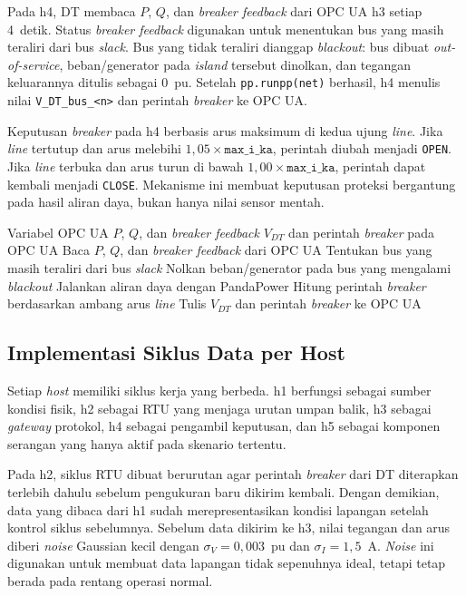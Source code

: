 Pada h4, \ac{DT} membaca $P$, $Q$, dan \textit{breaker feedback} dari OPC UA h3 setiap 4~detik. Status \textit{breaker feedback} digunakan untuk menentukan bus yang masih teraliri dari bus \textit{slack}. Bus yang tidak teraliri dianggap \textit{blackout}: bus dibuat \textit{out-of-service}, beban/generator pada \textit{island} tersebut dinolkan, dan tegangan keluarannya ditulis sebagai 0~pu. Setelah \texttt{pp.runpp(net)} berhasil, h4 menulis nilai \texttt{V\_DT\_bus\_<n>} dan perintah \textit{breaker} ke OPC UA.

Keputusan \textit{breaker} pada h4 berbasis arus maksimum di kedua ujung \textit{line}. Jika \textit{line} tertutup dan arus melebihi $1{,}05 \times \texttt{max\_i\_ka}$, perintah diubah menjadi \texttt{OPEN}. Jika \textit{line} terbuka dan arus turun di bawah $1{,}00 \times \texttt{max\_i\_ka}$, perintah dapat kembali menjadi \texttt{CLOSE}. Mekanisme ini membuat keputusan proteksi bergantung pada hasil aliran daya, bukan hanya nilai sensor mentah.

\begin{algorithm}[H]
\caption{Siklus \textit{digital twin} pada h4}
\begin{compactalgorithmic}[1]
\Require Variabel OPC UA $P$, $Q$, dan \textit{breaker feedback}
\Ensure $V_{DT}$ dan perintah \textit{breaker} pada OPC UA
\Loop
    \State Baca $P$, $Q$, dan \textit{breaker feedback} dari OPC UA
    \State Tentukan bus yang masih teraliri dari bus \textit{slack}
    \State Nolkan beban/generator pada bus yang mengalami \textit{blackout}
    \State Jalankan aliran daya dengan PandaPower
    \State Hitung perintah \textit{breaker} berdasarkan ambang arus \textit{line}
    \State Tulis $V_{DT}$ dan perintah \textit{breaker} ke OPC UA
\EndLoop
\end{compactalgorithmic}
\end{algorithm}

\subsection{Implementasi Siklus Data per Host}
\label{subsec:implementasi_siklus_data_per_host}
Setiap \textit{host} memiliki siklus kerja yang berbeda. h1 berfungsi sebagai sumber kondisi fisik, h2 sebagai RTU yang menjaga urutan umpan balik, h3 sebagai \textit{gateway} protokol, h4 sebagai pengambil keputusan, dan h5 sebagai komponen serangan yang hanya aktif pada skenario tertentu.

Pada h2, siklus RTU dibuat berurutan agar perintah \textit{breaker} dari \ac{DT} diterapkan terlebih dahulu sebelum pengukuran baru dikirim kembali. Dengan demikian, data yang dibaca dari h1 sudah merepresentasikan kondisi lapangan setelah kontrol siklus sebelumnya. Sebelum data dikirim ke h3, nilai tegangan dan arus diberi \textit{noise} Gaussian kecil dengan $\sigma_V=0{,}003$~pu dan $\sigma_I=1{,}5$~A. \textit{Noise} ini digunakan untuk membuat data lapangan tidak sepenuhnya ideal, tetapi tetap berada pada rentang operasi normal.


